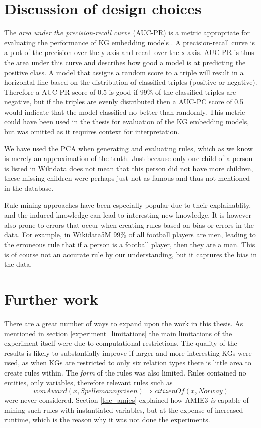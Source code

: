 \section{Discussion of design choices}
The \textit{area under the precision-recall curve} (AUC-PR) is a metric appropriate for evaluating the performance of KG embedding models \cite{jahn2021reasoning}. A precision-recall curve is a plot of the precision over the y-axis and recall over the x-axis. AUC-PR is thus the area under this curve and describes how good a model is at predicting the positive class. A model that assigns a random score to a triple will result in a horizontal line based on the distribution of classified triples (positive or negative). Therefore a AUC-PR score of 0.5 is good if 99\% of the classified triples are negative, but if the triples are evenly distributed then a AUC-PC score of 0.5 would indicate that the model classified no better than randomly. This metric could have been used in the thesis for evaluation of the KG embedding models, but was omitted as it requires context for interpretation.


We have used the PCA when generating and evaluating rules, which as we know is merely an approximation of the truth. Just because only one child of a person is listed in Wikidata does not mean that this person did not have more children, these missing children were perhaps just not as famous and thus not mentioned in the database.

Rule mining approaches have been especially popular due to their explainablity, and the induced knowledge can lead to interesting new knowledge. It is however also prone to errors that occur when creating rules based on bias or errors in the data. For example, in Wikidata5M 99\% of all football players are men, leading to the erroneous rule that if a person is a football player, then they are a man. This is of course not an accurate rule by our understanding, but it captures the bias in the data.

\section{Further work}
There are a great number of ways to expand upon the work in this thesis. As mentioned in section \ref{experiment_limitations} the main limitations of the experiment itself were due to computational restrictions. The quality of the results is likely to substantially improve if larger and more interesting KGs were used, as when KGs are restricted to only six relation types there is little area to create rules within. The \textit{form} of the rules was also limited. Rules contained no entities, only variables, therefore relevant rules such as
\[wonAward(x, Spellemannprisen) \Rightarrow citizenOf(x, Norway)\]
were never considered. Section \ref{the_amies} explained how AMIE3 \textit{is} capable of mining such rules with instantiated variables, but at the expense of increased runtime, which is the reason why it was not done the experiments.

